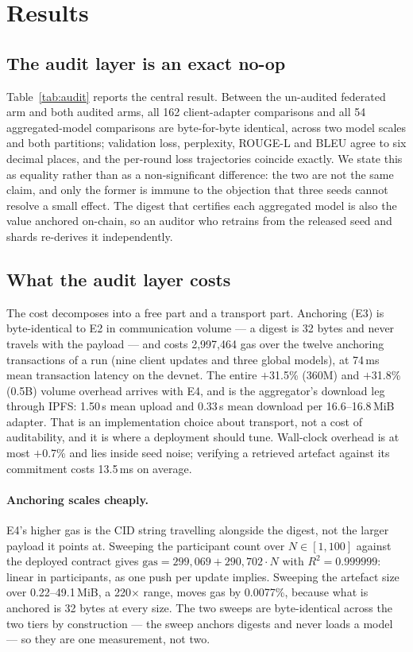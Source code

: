 \documentclass[11pt]{article}
\begin{document}
\section{Results}

\subsection{The audit layer is an exact no-op}
\label{sec:noop}

Table~\ref{tab:audit} reports the central result. Between the un-audited federated arm and both audited arms, all 162 client-adapter comparisons and all 54 aggregated-model comparisons are byte-for-byte identical, across two model scales and both partitions; validation loss, perplexity, ROUGE-L and BLEU agree to six decimal places, and the per-round loss trajectories coincide exactly. We state this as equality rather than as a non-significant difference: the two are not the same claim, and only the former is immune to the objection that three seeds cannot resolve a small effect. The digest that certifies each aggregated model is also the value anchored on-chain, so an auditor who retrains from the released seed and shards re-derives it independently.

\subsection{What the audit layer costs}
\label{sec:cost}

The cost decomposes into a free part and a transport part. Anchoring (E3) is byte-identical to E2 in communication volume --- a digest is 32 bytes and never travels with the payload --- and costs 2,997,464 gas over the twelve anchoring transactions of a run (nine client updates and three global models), at 74\,ms mean transaction latency on the devnet. The entire $+$31.5\% (360M) and $+$31.8\% (0.5B) volume overhead arrives with E4, and is the aggregator's download leg through IPFS: 1.50\,s mean upload and 0.33\,s mean download per 16.6--16.8\,MiB adapter. That is an implementation choice about transport, not a cost of auditability, and it is where a deployment should tune. Wall-clock overhead is at most $+$0.7\% and lies inside seed noise; verifying a retrieved artefact against its commitment costs 13.5\,ms on average.

\paragraph{Anchoring scales cheaply.} E4's higher gas is the CID string travelling alongside the digest, not the larger payload it points at. Sweeping the participant count over $N \in [1, 100]$ against the deployed contract gives $\text{gas} = 299{,}069 + 290{,}702\cdot N$ with $R^2 = 0.999999$: linear in participants, as one push per update implies. Sweeping the artefact size over 0.22--49.1\,MiB, a 220$\times$ range, moves gas by 0.0077\%, because what is anchored is 32 bytes at every size. The two sweeps are byte-identical across the two tiers by construction --- the sweep anchors digests and never loads a model --- so they are one measurement, not two.
\end{document}
